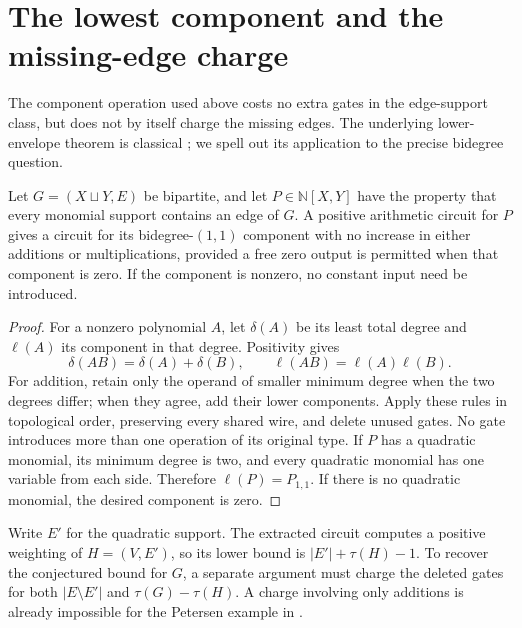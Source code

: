 \section{The lowest component and the missing-edge charge}
The component operation used above costs no extra gates in the edge-support class, but does not by itself charge the missing edges. The underlying lower-envelope theorem is classical \citep[Theorem~2.4, p.~879]{JerrumSnir1982}; we spell out its application to the precise bidegree question.

\begin{proposition}\label{prop:componentzero}
Let $G=(X\sqcup Y,E)$ be bipartite, and let $P\in\mathbb N[X,Y]$ have the property that every monomial support contains an edge of $G$. A positive arithmetic circuit for $P$ gives a circuit for its bidegree-$(1,1)$ component with no increase in either additions or multiplications, provided a free zero output is permitted when that component is zero. If the component is nonzero, no constant input need be introduced.
\end{proposition}
\begin{proof}
For a nonzero polynomial $A$, let $\delta(A)$ be its least total degree and $\ell(A)$ its component in that degree. Positivity gives
\[
 \delta(AB)=\delta(A)+\delta(B),\qquad
 \ell(AB)=\ell(A)\ell(B).
\]
For addition, retain only the operand of smaller minimum degree when the two degrees differ; when they agree, add their lower components. Apply these rules in topological order, preserving every shared wire, and delete unused gates. No gate introduces more than one operation of its original type. If $P$ has a quadratic monomial, its minimum degree is two, and every quadratic monomial has one variable from each side. Therefore $\ell(P)=P_{1,1}$. If there is no quadratic monomial, the desired component is zero.
\end{proof}

Write $E'$ for the quadratic support. The extracted circuit computes a positive weighting of $H=(V,E')$, so its lower bound is $|E'|+\tau(H)-1$. To recover the conjectured bound for $G$, a separate argument must charge the deleted gates for both $|E\setminus E'|$ and $\tau(G)-\tau(H)$. A charge involving only additions is already impossible for the Petersen example in \citet[Section~6, example `A repeated-variable tradeoff on the Petersen graph']{OneSidedCompanion}.

